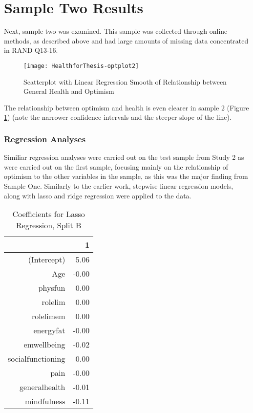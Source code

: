 \documentclass{article}
\begin{document}
\part{Sample Two Results}

Next, sample two was examined. This sample was collected through online methods, as described above and had large amounts of missing data concentrated in RAND Q13-16. 

\begin{figure}
\texttt{[image: HealthforThesis-optplot2]}
  \caption{Scatterplot with Linear Regression Smooth of Relationship between General Health and Optimism}
  \label{fig:genhealthoptplot2}
\end{figure}


The relationship between optimism and health is even clearer in sample 2 (Figure \ref{fig:genhealthoptplot2}) (note the narrower confidence intervals and the steeper slope of the line).

\section{Regression Analyses}
\label{sec:regression-analyses}

Similiar regression analyses were carried out on the test sample from Study 2 as were carried out on the first sample, focusing mainly on the relationship of optimism to the other variables in the sample, as this was the major finding from Sample One. Similarly to the earlier work, stepwise linear regression models, along with lasso and ridge regression were applied to the data. 



\begin{table}[ht]
\centering
\begin{tabular}{rr}
  \hline
 & 1 \\ 
  \hline
(Intercept) & 5.06 \\ 
  Age & -0.00 \\ 
  physfun & 0.00 \\ 
  rolelim & 0.00 \\ 
  rolelimem & 0.00 \\ 
  energyfat & -0.00 \\ 
  emwellbeing & -0.02 \\ 
  socialfunctioning & 0.00 \\ 
  pain & -0.00 \\ 
  generalhealth & -0.01 \\ 
  mindfulness & -0.11 \\ 
   \hline
\end{tabular}
\caption{Coefficients for Lasso Regression, Split B} 
\label{tab:optlasso2b}
\end{table}
\end{document}
